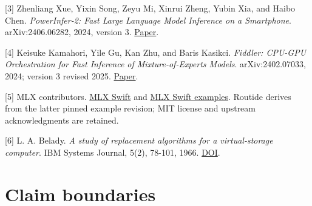 \documentclass[11pt]{article}
\begin{document}
{[}3{]} Zhenliang Xue, Yixin Song, Zeyu Mi, Xinrui Zheng, Yubin Xia, and Haibo Chen.
\emph{PowerInfer-2: Fast Large Language Model Inference on a Smartphone}.
arXiv:2406.06282, 2024, version 3.
\href{https://arxiv.org/abs/2406.06282v3}{Paper}.

{[}4{]} Keisuke Kamahori, Yile Gu, Kan Zhu, and Baris Kasikci.
\emph{Fiddler: CPU-GPU Orchestration for Fast Inference of Mixture-of-Experts
Models}. arXiv:2402.07033, 2024; version 3 revised 2025.
\href{https://arxiv.org/abs/2402.07033v3}{Paper}.

{[}5{]} MLX contributors. \href{https://github.com/ml-explore/mlx-swift}{MLX Swift}
and \href{https://github.com/ml-explore/mlx-swift-examples/tree/378f2449c257788c5067b9f8b086731d76b39b33}{MLX Swift examples}.
Routide derives from the latter pinned example revision; MIT license and
upstream acknowledgments are retained.

{[}6{]} L. A. Belady. \emph{A study of replacement algorithms for a virtual-storage
computer}. IBM Systems Journal, 5(2), 78-101, 1966.
\href{https://doi.org/10.1147/sj.52.0078}{DOI}.

\appendix

\hypertarget{claim-boundaries}{%
\section{Claim boundaries}\label{claim-boundaries}}
\end{document}
